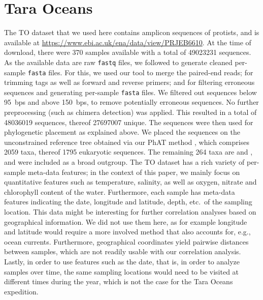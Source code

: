 \section{Tara Oceans}
\label{supp:sec:DetailsEmpiricalDatasets:sub:Tara}

The \acf{TO} dataset \cite{Karsenti2011,Sunagawa2015,Guidi2016}
that we used here contains amplicon sequences of protists,
and is available at \url{https://www.ebi.ac.uk/ena/data/view/PRJEB6610}.
At the time of download, there were \num{370} samples available
with a total of \num{49 023 231} sequences.
As the available data are raw \texttt{fastq} files,
we followed \cite{FredsMetabarcodingPipeline} to generate cleaned per-sample \texttt{fasta} files.
For this, we used our tool  \cite{Zhang2014} to merge the paired-end reads;
 \cite{Martin2011} for trimming tags as well as forward and reverse primers;
and  \cite{Rognes2016} for filtering erroneous sequences and
generating per-sample \texttt{fasta} files.
We filtered out sequences below \SI{95}{bps} and above \SI{150}{bps}, to remove potentially erroneous sequences.
No further preprocessing (such as chimera detection) was applied.
This resulted in a total of \num{48 036 019} sequences, thereof \num{27 697 007} unique.
The sequences were then used for phylogenetic placement as explained above.
We placed the sequences on the unconstrained  reference tree obtained via our \ac{PhAT} method \cite{Czech2018},
which comprises \num{2 059} taxa, thereof \num{1 795} eukaryotic sequences.
The remaining \num{264} taxa are  and ,
and were included as a broad outgroup.
The \ac{TO} dataset has a rich variety of per-sample meta-data features;
in the context of this paper, we mainly focus on quantitative features such as
temperature, salinity, as well as oxygen, nitrate and chlorophyll content of the water.
Furthermore, each sample has meta-data features indicating the date, longitude and latitude, depth, etc.~of the sampling location.
This data might be interesting for further correlation analyses based on geographical information.
We did not use them here, as for example longitude and latitude would require a more involved method
that also accounts for, e.g., ocean currents.
Furthermore, geographical coordinates yield pairwise distances between samples,
which are not readily usable with our correlation analysis.
Lastly, in order to use features such as the date, that is, in order to analyze samples over time,
the same sampling locations would need to be visited at different times during the year,
which is not the case for the Tara Oceans expedition.

